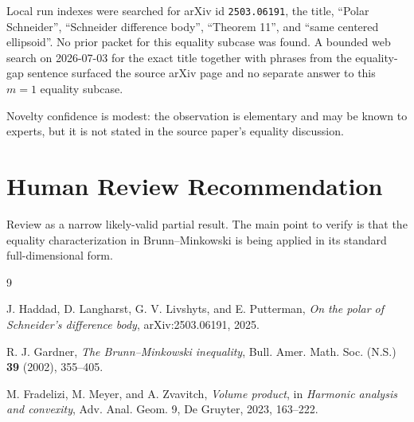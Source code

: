 \documentclass[11pt]{amsart}
\begin{document}
Local run indexes were searched for arXiv id \texttt{2503.06191}, the title,
``Polar Schneider'', ``Schneider difference body'', ``Theorem 11'', and
``same centered ellipsoid''.  No prior packet for this equality subcase was
found.  A bounded web search on 2026-07-03 for the exact title together with
phrases from the equality-gap sentence surfaced the source arXiv page and no
separate answer to this \(m=1\) equality subcase.

Novelty confidence is modest: the observation is elementary and may be known to
experts, but it is not stated in the source paper's equality discussion.

\section*{Human Review Recommendation}

Review as a narrow likely-valid partial result.  The main point to verify is
that the equality characterization in Brunn--Minkowski is being applied in its
standard full-dimensional form.

\begin{thebibliography}{9}

J. Haddad, D. Langharst, G. V. Livshyts, and E. Putterman,
\emph{On the polar of Schneider's difference body},
arXiv:2503.06191, 2025.

R. J. Gardner,
\emph{The Brunn--Minkowski inequality},
Bull. Amer. Math. Soc. (N.S.) \textbf{39} (2002), 355--405.

M. Fradelizi, M. Meyer, and A. Zvavitch,
\emph{Volume product},
in \emph{Harmonic analysis and convexity}, Adv. Anal. Geom. 9,
De Gruyter, 2023, 163--222.

\end{thebibliography}
\end{document}
